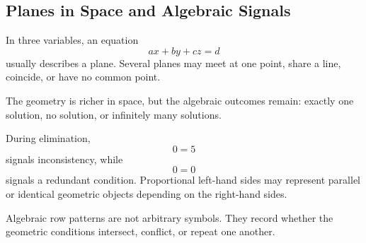 \subsection{Planes in Space and Algebraic Signals}

In three variables, an equation
\[
ax+by+cz=d
\]
usually describes a plane. Several planes may meet at one point, share a line, coincide, or have no common point.

\begin{corebox}
The geometry is richer in space, but the algebraic outcomes remain: exactly one solution, no solution, or infinitely many solutions.
\end{corebox}

During elimination,
\[
0=5
\]
signals inconsistency, while
\[
0=0
\]
signals a redundant condition. Proportional left-hand sides may represent parallel or identical geometric objects depending on the right-hand sides.

\begin{summarybox}
Algebraic row patterns are not arbitrary symbols. They record whether the geometric conditions intersect, conflict, or repeat one another.
\end{summarybox}
